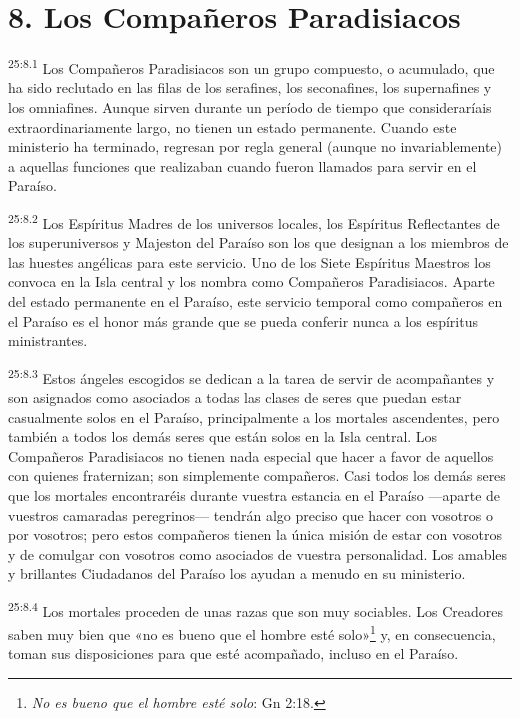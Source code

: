 \section*{8. Los Compañeros Paradisiacos}
\par
\textsuperscript{25:8.1} Los Compañeros Paradisiacos son un grupo compuesto, o acumulado, que ha sido reclutado en las filas de los serafines, los seconafines, los supernafines y los omniafines. Aunque sirven durante un período de tiempo que consideraríais extraordinariamente largo, no tienen un estado permanente. Cuando este ministerio ha terminado, regresan por regla general (aunque no invariablemente) a aquellas funciones que realizaban cuando fueron llamados para servir en el Paraíso.

\par
\textsuperscript{25:8.2} Los Espíritus Madres de los universos locales, los Espíritus Reflectantes de los superuniversos y Majeston del Paraíso son los que designan a los miembros de las huestes angélicas para este servicio. Uno de los Siete Espíritus Maestros los convoca en la Isla central y los nombra como Compañeros Paradisiacos. Aparte del estado permanente en el Paraíso, este servicio temporal como compañeros en el Paraíso es el honor más grande que se pueda conferir nunca a los espíritus ministrantes.

\par
\textsuperscript{25:8.3} Estos ángeles escogidos se dedican a la tarea de servir de acompañantes y son asignados como asociados a todas las clases de seres que puedan estar casualmente solos en el Paraíso, principalmente a los mortales ascendentes, pero también a todos los demás seres que están solos en la Isla central. Los Compañeros Paradisiacos no tienen nada especial que hacer a favor de aquellos con quienes fraternizan; son simplemente compañeros. Casi todos los demás seres que los mortales encontraréis durante vuestra estancia en el Paraíso ---aparte de vuestros camaradas peregrinos--- tendrán algo preciso que hacer con vosotros o por vosotros; pero estos compañeros tienen la única misión de estar con vosotros y de comulgar con vosotros como asociados de vuestra personalidad. Los amables y brillantes Ciudadanos del Paraíso los ayudan a menudo en su ministerio.

\par
\textsuperscript{25:8.4} Los mortales proceden de unas razas que son muy sociables. Los Creadores saben muy bien que «no es bueno que el hombre esté solo»\footnote{\textit{No es bueno que el hombre esté solo}: Gn 2:18.} y, en consecuencia, toman sus disposiciones para que esté acompañado, incluso en el Paraíso.

